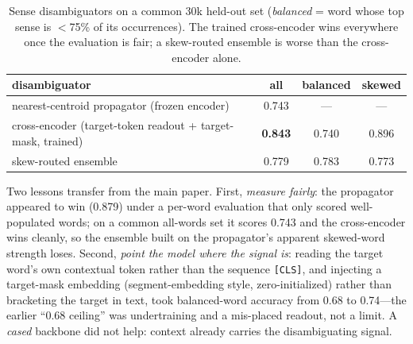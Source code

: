 \documentclass[11pt]{article}
\begin{document}
\begin{table}[h]\centering
\caption{Sense disambiguators on a common 30k held-out set (\emph{balanced} = word whose top
sense is $<$75\% of its occurrences). The trained cross-encoder wins everywhere once the
evaluation is fair; a skew-routed ensemble is worse than the cross-encoder alone.}
\label{tab:wsd}
\begin{tabular}{lccc}
\toprule
disambiguator & all & balanced & skewed \\
\midrule
nearest-centroid propagator (frozen encoder) & 0.743 & --- & --- \\
cross-encoder (target-token readout + target-mask, trained) & \textbf{0.843} & 0.740 & 0.896 \\
skew-routed ensemble & 0.779 & 0.783 & 0.773 \\
\bottomrule
\end{tabular}
\end{table}

Two lessons transfer from the main paper. First, \emph{measure fairly}: the propagator
appeared to win (0.879) under a per-word evaluation that only scored well-populated words; on
a common all-words set it scores 0.743 and the cross-encoder wins cleanly, so the ensemble
built on the propagator's apparent skewed-word strength loses. Second, \emph{point the model
where the signal is}: reading the target word's own contextual token rather than the
sequence \texttt{[CLS]}, and injecting a target-mask embedding (segment-embedding style,
zero-initialized) rather than bracketing the target in text, took balanced-word accuracy from
0.68 to 0.74---the earlier ``0.68 ceiling'' was undertraining and a mis-placed readout, not a
limit. A \emph{cased} backbone did not help: context already carries the disambiguating signal.
\end{document}
